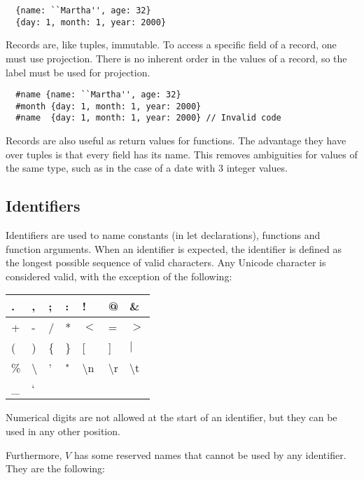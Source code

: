 \documentclass{article}
\begin{document}
\begin{lstlisting}
  {name: ``Martha'', age: 32}
  {day: 1, month: 1, year: 2000}
\end{lstlisting}

Records are, like tuples, immutable.
To access a specific field of a record, one must use projection.
There is no inherent order in the values of a record, so the label must be used for projection.

\begin{lstlisting}
  #name {name: ``Martha'', age: 32}
  #month {day: 1, month: 1, year: 2000}
  #name  {day: 1, month: 1, year: 2000} // Invalid code
\end{lstlisting}

Records are also useful as return values for functions.
The advantage they have over tuples is that every field has its name.
This removes ambiguities for values of the same type, such as in the case of a date with 3 integer values.

\subsection{Identifiers}

Identifiers are used to name constants (in let declarations), functions and function arguments.
When an identifier is expected, the identifier is defined as the longest possible sequence of valid characters.
Any Unicode character is considered valid, with the exception of the following:

\medskip

\begin{tabular}{|l|l|l|l|l|l|l|}
  \hline
  . & , & ; & : & ! & @ & \&\\
  \hline
  + & - & / & * & $<$ & = & $>$ \\
  \hline
  ( & ) & \{ & \} & [ & ] & $|$ \\
  \hline
  \% & \textbackslash & ' & " & \textbackslash n & \textbackslash r & \textbackslash t\\
  \hline
  \_ & \lq\\
  \hline
\end{tabular}

\bigskip

Numerical digits are not allowed at the start of an identifier, but they can be used in any other position.

Furthermore, $V$ has some reserved names that cannot be used by any identifier.
They are the following:

\medskip
\end{document}
